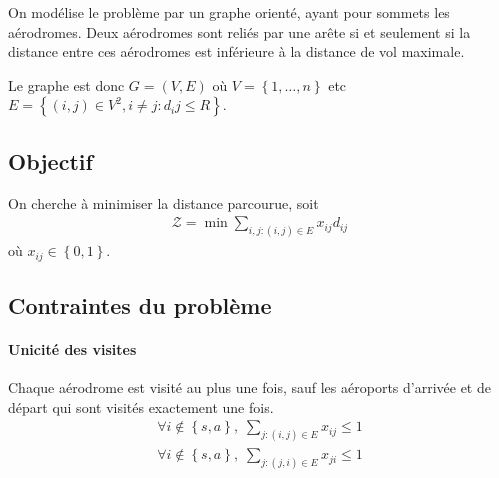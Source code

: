\documentclass{article}
\newcommand{\dij}{d_{ij}}
\newcommand{\xij}{x_{ij}}
\newcommand{\xji}{x_{ji}}
\begin{document}
On modélise le problème par un graphe orienté, ayant pour sommets les aérodromes.
Deux aérodromes sont reliés par une arête si et seulement si la distance entre
ces aérodromes est inférieure à la distance de vol maximale.

Le graphe est donc $G = (V, E)$ où $V = \left\{1,\dots,n\right\}$ etc
$E = \left\{(i, j) \in V^2, i \neq j : d_ij \leq R\right\}$.

\subsection{Objectif}

On cherche à minimiser la distance parcourue, soit
\begin{align}
  \mathcal{Z} = \min \sum_{i,j : (i, j) \in E} \xij \dij
\end{align}
où $\xij \in \left\{0, 1\right\}$.

\subsection{Contraintes du problème}

\paragraph{Unicité des visites} Chaque aérodrome est visité au plus une fois, 
sauf les aéroports d'arrivée et de départ qui sont visités exactement une fois.
\begin{subequations}
\begin{align}
  \forall i \notin \left\{s, a\right\},\;
    \sum_{j: (i, j) \in E} \xij \leq 1 \\
  \forall i \notin \left\{s, a\right\},\;
    \sum_{j: (j, i) \in E} \xji \leq 1
\end{align}
\end{subequations}
\end{document}
